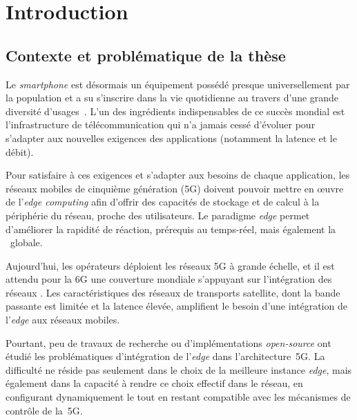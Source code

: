 \documentclass[../main.tex]{subfiles}
\begin{document}
\initSubfile
{}

\chapter*{Introduction}
\label{ch:introduction}

\begingroup
\setlength{\parskip}{2em}

\section*{Contexte et problématique de la thèse}
Le \textit{smartphone} est désormais un équipement possédé presque universellement par la population et a su s’inscrire dans la vie quotidienne au travers d’une grande diversité d’usages~\cite{CREDOC.2026.BAROMETRE.NUMERIQUE}.
L’un des ingrédients indispensables de ce succès mondial est l’infrastructure de télécommunication qui n’a jamais cessé d’évoluer pour s’adapter aux nouvelles exigences des applications (notamment la latence et le débit).

Pour satisfaire à ces exigences et s’adapter aux besoins de chaque application, les réseaux mobiles de cinquième génération (5G) doivent pouvoir mettre en œuvre de l’\textit{edge computing} afin d’offrir des capacités de stockage et de calcul à la périphérie du réseau, proche des utilisateurs.
Le paradigme \textit{edge} permet d’améliorer la rapidité de réaction, prérequis au temps-réel, mais également la ~globale.

Aujourd'hui, les opérateurs déploient les réseaux 5G à grande échelle, et il est attendu pour la 6G une couverture mondiale s’appuyant sur l’intégration des réseaux .
Les caractéristiques des réseaux de transports satellite, dont la bande passante est limitée et la latence élevée, amplifient le besoin d’une intégration de l’\textit{edge} aux réseaux mobiles.

Pourtant, peu de travaux de recherche ou d’implémentations \textit{open-source} ont étudié les problématiques d’intégration de l’\textit{edge} dans l’architecture~5G.
La difficulté ne réside pas seulement dans le choix de la meilleure instance \textit{edge}, mais également dans la capacité à rendre ce choix effectif dans le réseau, en configurant dynamiquement le  tout en restant compatible avec les mécanismes de contrôle de la~5G.
\end{document}
